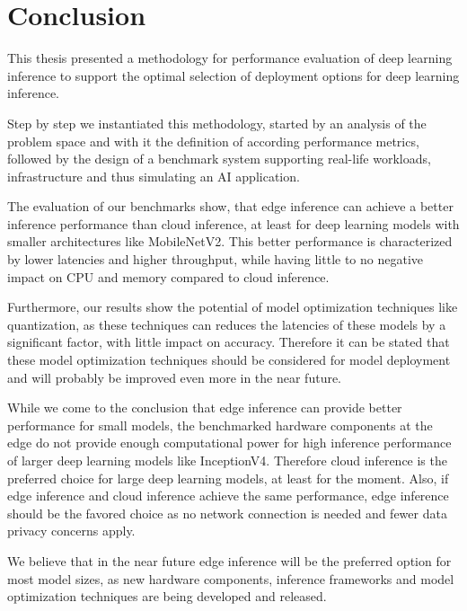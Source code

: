 \chapter{Conclusion}
\label{chap:conclusion}
%
This thesis presented a methodology for performance evaluation of deep learning inference to support the optimal selection of deployment options for deep learning inference.

Step by step we instantiated this methodology, started by an analysis of the problem space and with it the definition of according performance metrics, followed by the design of a benchmark system supporting real-life workloads, infrastructure and thus simulating an AI application.

The evaluation of our benchmarks show, that edge inference can achieve a better inference performance than cloud inference, at least for deep learning models with smaller architectures like MobileNetV2.
This better performance is characterized by lower latencies and higher throughput, while having little to no negative impact on CPU and memory compared to cloud inference.

Furthermore, our results show the potential of model optimization techniques like quantization, as these techniques can reduces the latencies of these models by a significant factor, with little impact on accuracy.
Therefore it can be stated that these model optimization techniques should be considered for model deployment and will probably be improved even more in the near future.

While we come to the conclusion that edge inference can provide better performance for small models, the benchmarked hardware components at the edge do not provide enough computational power for high inference performance of larger deep learning models like InceptionV4.
Therefore cloud inference is the preferred choice for large deep learning models, at least for the moment.
Also, if edge inference and cloud inference achieve the same performance, edge inference should be the favored choice as no network connection is needed and fewer data privacy concerns apply.

We believe that in the near future edge inference will be the preferred option for most model sizes, as new hardware components, inference frameworks and model optimization techniques are being developed and released.

